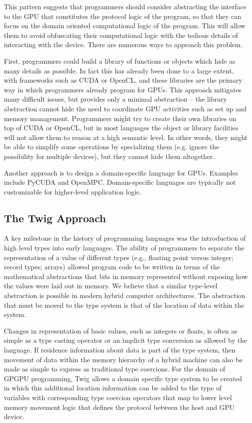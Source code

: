 \documentclass[11pt]{article}
\begin{document}
This pattern suggests that programmers should consider abstracting the
interface to the GPU that constitutes the protocol logic of the program, so
that they can focus on the domain oriented computational logic of the program.
This will allow them to avoid obfuscating their computational logic with the
tedious details of interacting with the device. There are numerous ways to
approach this problem.

First, programmers could build a library of functions or objects which hide as
many details as possible. In fact this has already been done to a large
extent, with frameworks such as CUDA or OpenCL, and these libraries are the
primary way in which programmers already program for GPUs. This approach
mitigates many difficult issues, but provides only a minimal abstraction --
the library abstraction cannot hide the need to coordinate GPU activities such
as set up and memory management. Programmers might try to create their own
libraries on top of CUDA or OpenCL, but in most languages the object or
library facilities will not allow them to reason at a high semantic level. In
other words, they might be able to simplify some operations by specializing
them (e.g. ignore the possibility for multiple devices), but they cannot hide
them altogether.

Another approach is to design a domain-specific language for GPUs. Examples
include PyCUDA and OpenMPC. Domain-specific languages are typically not
customizable for higher-level application logic.

\subsection{The Twig Approach}


A key milestone in the history of programming languages was the introduction
of high level types into early languages. The ability of programmers to
separate the representation of a value of different types (e.g., floating
point versus integer; record types; arrays) allowed program code to be written
in terms of the mathematical abstractions that bits in memory represented
without exposing how the values were laid out in memory. We believe that a
similar type-level abstraction is possible in modern hybrid computer
architectures. The abstraction that must be moved to the type system is that
of the location of data within the system.

Changes in representation of basic values, such as integers or floats, is
often as simple as a type casting operator or an implicit type conversion as
allowed by the language. If residence information about data is part of the
type system, then movement of data within the memory hierarchy of a hybrid
machine can also be made as simple to express as traditional type coercions.
For the domain of GPGPU programming, Twig allows a domain specific type system
to be created in which this additional location information can be added to
the type of variables with corresponding type coercion operators that map to
lower level memory movement logic that defines the protocol between the host
and GPU device.
\end{document}
